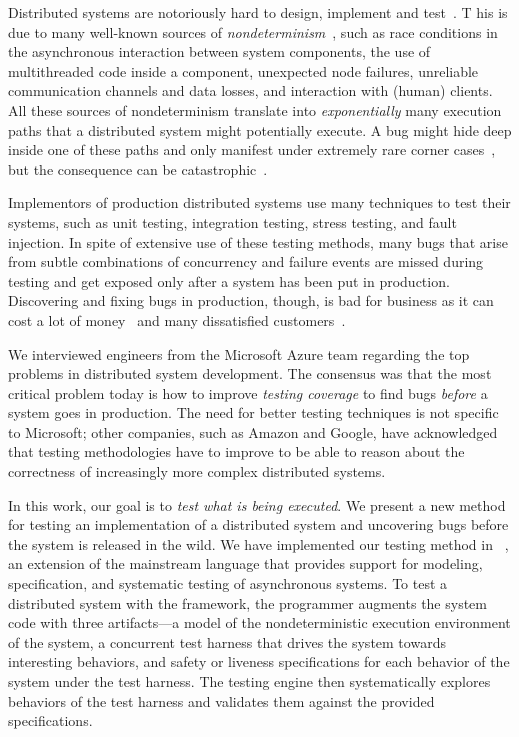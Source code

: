 Distributed systems are notoriously hard to design, implement and test~\cite{cavage2013there, laguna2015debugging, maddox2015test}. T
his is due to many well-known sources of \emph{nondeterminism}~\cite{chandra2007paxos}, such as race conditions in the asynchronous interaction between system components, the use of multithreaded code inside a component, unexpected node failures, unreliable communication channels and data losses, and interaction with (human) clients.
All these sources of nondeterminism translate into \emph{exponentially} many execution paths that a distributed system might potentially execute.
A bug might hide deep inside one of these paths and only manifest under extremely rare corner cases~\cite{gray1986computers, musuvathi2008finding}, but the consequence can be catastrophic~\cite{amazon2012aws, google2014outage}.

Implementors of production distributed systems use many techniques to test their systems,
such as unit testing, integration testing, stress testing, and fault injection.
In spite of extensive use of these testing methods,
many bugs that arise from subtle combinations of concurrency and failure events
are missed during testing and get exposed only after a system has been put in production.
Discovering and fixing bugs in production, though, is bad for business as it can cost a lot of money~\cite{tassey2002economic} 
and many dissatisfied customers~\cite{amazon2012aws, google2014outage}.

We interviewed engineers from the Microsoft Azure team regarding the top problems in distributed system development.
The consensus was that the most critical problem today is how to improve \emph{testing coverage} to find bugs \emph{before} a system goes in production.
The need for better testing techniques is not specific to Microsoft;
other companies, such as Amazon and Google, have acknowledged~\cite{chandra2007paxos,newcombe2015aws} that testing methodologies have to improve to be able to reason about the correctness of increasingly more complex distributed systems. 

In this work, our goal is to \emph{test what is being executed}.
We present a new method for testing an implementation of a distributed system and uncovering bugs before the system is released in the wild.
We have implemented our testing method in \psharp~\cite{deligiannis2015psharp}, an extension of the mainstream language \csharp that provides
support for modeling, specification, and systematic testing of asynchronous systems.
To test a distributed system with the \psharp framework, the programmer augments the system code with three artifacts---a model of the nondeterministic execution environment of the system, a concurrent test harness that drives the system towards interesting behaviors, and safety or liveness specifications for each behavior of the system under the test harness.
The \psharp testing engine then systematically explores behaviors of the test harness and validates them against the provided specifications.

